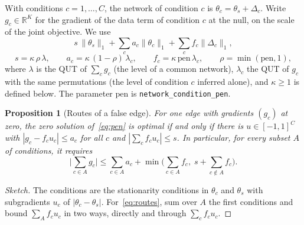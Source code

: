 \documentclass[a4paper, 11pt]{article}
\newcommand{\pen}{\mathrm{pen}}
\theoremstyle{plain}
\newtheorem{prop}{Proposition}
\theoremstyle{remark}
\begin{document}
With conditions $c = 1, \dots, C$, the network of condition $c$ is $\theta_c = \theta_s + \Delta_c$. Write $g_c \in \mathbb R^K$ for the gradient of the data term of condition $c$ at the null, on the scale of the joint objective. We use
\begin{equation}\label{eq:pen}
s\,\|\theta_s\|_1 + \sum_c a_c \|\theta_c\|_1 + \sum_c f_c \|\Delta_c\|_1,
\end{equation}
\begin{equation}\label{eq:levels}
s = \kappa\,\rho\,\lambda, \qquad a_c = \kappa\,(1 - \rho)\,\lambda_c, \qquad f_c = \kappa\,\pen\,\lambda_c, \qquad \rho = \min(\pen, 1),
\end{equation}
where $\lambda$ is the QUT of $\sum_c g_c$ (the level of a common network), $\lambda_c$ the QUT of $g_c$ with the same permutations (the level of condition $c$ inferred alone), and $\kappa \ge 1$ is defined below. The parameter $\pen$ is \texttt{network\_condition\_pen}.

\begin{prop}[Routes of a false edge]\label{prop:routes}
For one edge with gradients $(g_c)$ at zero, the zero solution of~\eqref{eq:pen} is optimal if and only if there is $u \in [-1,1]^C$ with $|g_c - f_c u_c| \le a_c$ for all $c$ and $|\sum_c f_c u_c| \le s$. In particular, for every subset $A$ of conditions, it requires
\begin{equation}\label{eq:routes}
\Big|\sum_{c \in A} g_c\Big| \le \sum_{c \in A} a_c + \min\Big(\sum_{c \in A} f_c,\; s + \sum_{c \notin A} f_c\Big).
\end{equation}
\end{prop}
\begin{proof}[Sketch]
The conditions are the stationarity conditions in $\theta_c$ and $\theta_s$ with subgradients $u_c$ of $|\theta_c - \theta_s|$. For~\eqref{eq:routes}, sum over $A$ the first conditions and bound $\sum_A f_c u_c$ in two ways, directly and through $\sum_c f_c u_c$.
\end{proof}
\end{document}
